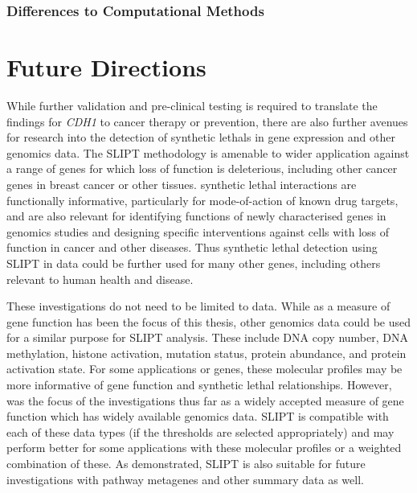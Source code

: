 \subsubsection{Differences to Computational Methods}
\label{chapt6:slipt_compare_computational}
\fi

\section{Future Directions}
\label{chapt6:future}

While further validation and pre-clinical testing is required to translate the findings for \textit{CDH1} to cancer therapy or prevention, there are also further avenues for research into the detection of \glspl{synthetic lethal} in \gls{gene expression} and other \glspl{genomic} data. The \gls{SLIPT} methodology is amenable to wider application against a range of genes for which loss of function is deleterious, including other cancer genes in breast cancer or other tissues. \Gls{synthetic lethal} interactions are functionally informative, particularly for mode-of-action of known drug targets, and are also relevant for identifying functions of newly characterised genes in \glspl{genomic} studies and designing specific interventions against cells with loss of function in cancer and other diseases. Thus \gls{synthetic lethal} detection using \gls{SLIPT} in  data could be further used for many other genes, including others relevant to human health and disease.

These investigations do not need to be limited to  data. While  as a measure of gene function has been the focus of this thesis, other \glspl{genomic} data could be used for a similar purpose for \gls{SLIPT} analysis. These include \acrshort{DNA} copy number, \acrshort{DNA} methylation, histone activation, \gls{mutation} status, protein abundance, and protein activation state. For some applications or genes, these molecular profiles may be more informative of gene function and \gls{synthetic lethal} relationships. However,  was the focus of the investigations thus far as a widely accepted measure of gene function which has widely available \glspl{genomic} data.  \gls{SLIPT} is compatible with each of these data types (if the thresholds are selected appropriately) and may perform better for some applications with these molecular profiles or a weighted combination of these. As demonstrated, \gls{SLIPT} is also suitable for future investigations with pathway \glspl{metagene} and other summary data as well.

